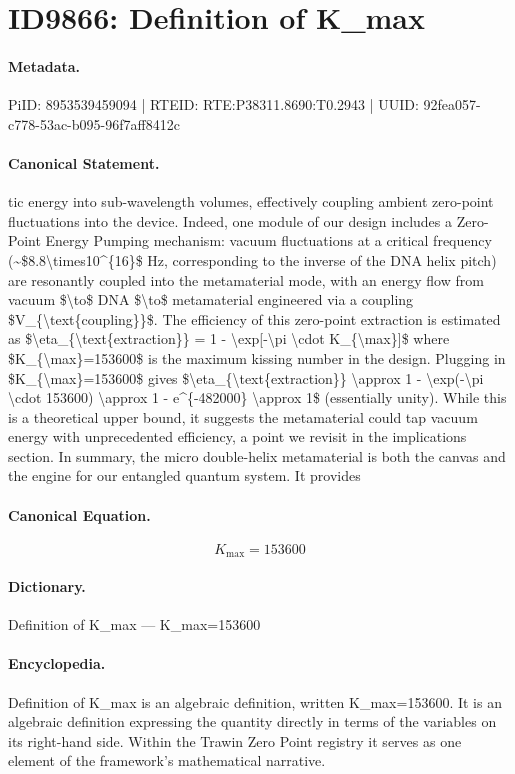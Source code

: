 \section*{ID9866: Definition of K\_max}
\paragraph{Metadata.}
PiID: 8953539459094 | RTEID: RTE:P38311.8690:T0.2943 | UUID: 92fea057-c778-53ac-b095-96f7aff8412c

\paragraph{Canonical Statement.}
tic energy into sub-wavelength volumes, effectively coupling ambient zero-point fluctuations into the device. Indeed, one module of our design includes a Zero-Point Energy Pumping mechanism: vacuum fluctuations at a critical frequency (\textasciitilde{}\$8.8\textbackslash{}times10\textasciicircum{}\{16\}\$ Hz, corresponding to the inverse of the DNA helix pitch) are resonantly coupled into the metamaterial mode, with an energy flow from vacuum \$\textbackslash{}to\$ DNA \$\textbackslash{}to\$ metamaterial engineered via a coupling \$V\_\{\textbackslash{}text\{coupling\}\}\$. The efficiency of this zero-point extraction is estimated as \$\textbackslash{}eta\_\{\textbackslash{}text\{extraction\}\} = 1 - \textbackslash{}exp[-\textbackslash{}pi \textbackslash{}cdot K\_\{\textbackslash{}max\}]\$ where \$K\_\{\textbackslash{}max\}=153600\$ is the maximum kissing number in the design. Plugging in \$K\_\{\textbackslash{}max\}=153600\$ gives \$\textbackslash{}eta\_\{\textbackslash{}text\{extraction\}\} \textbackslash{}approx 1 - \textbackslash{}exp(-\textbackslash{}pi \textbackslash{}cdot 153600) \textbackslash{}approx 1 - e\textasciicircum{}\{-482000\} \textbackslash{}approx 1\$ (essentially unity). While this is a theoretical upper bound, it suggests the metamaterial could tap vacuum energy with unprecedented efficiency, a point we revisit in the implications section. In summary, the micro double-helix metamaterial is both the canvas and the engine for our entangled quantum system. It provides

\paragraph{Canonical Equation.}
\[
K_{\max}=153600
\]

\paragraph{Dictionary.}
Definition of K\_max — K\_max=153600

\paragraph{Encyclopedia.}
Definition of K\_max is an algebraic definition, written K\_max=153600. It is an algebraic definition expressing the quantity directly in terms of the variables on its right-hand side. Within the Trawin Zero Point registry it serves as one element of the framework's mathematical narrative.
